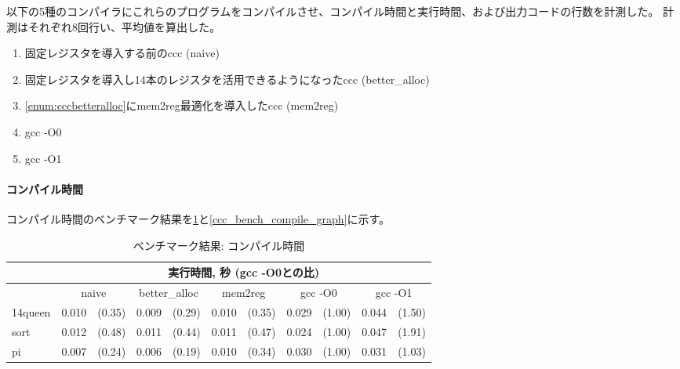 \documentclass[uplatex,a4paper]{jsarticle}
\begin{document}
以下の5種のコンパイラにこれらのプログラムをコンパイルさせ、コンパイル時間と実行時間、および出力コードの行数を計測した。
計測はそれぞれ8回行い、平均値を算出した。

\begin{enumerate}
   \item 固定レジスタを導入する前のccc (naive)
   \item \label{enum:cccbetteralloc} 固定レジスタを導入し14本のレジスタを活用できるようになったccc (better\_alloc)
   \item \cref{enum:cccbetteralloc}にmem2reg最適化を導入したccc (mem2reg)
   \item gcc -O0
   \item gcc -O1
\end{enumerate}

\clearpage
\paragraph{コンパイル時間}

コンパイル時間のベンチマーク結果を\cref{ccc_bench_compile}と\cref{ccc_bench_compile_graph}に示す。

\begin{table}[h]
  \centering
  \begin{tabular}{l|rl|rl|rl|rl|rl}
    &\multicolumn{10}{c}{実行時間, 秒 (gcc -O0との比)} \\ \hline
    &\multicolumn{2}{c|}{naive}&\multicolumn{2}{c|}{better\_alloc}&\multicolumn{2}{c|}{mem2reg}&\multicolumn{2}{c|}{gcc -O0}&\multicolumn{2}{c}{gcc -O1} \\ \hline\hline
    14queen&0.010&(0.35)&0.009&(0.29)&0.010&(0.35)&0.029&(1.00)&0.044&(1.50) \\
    sort&0.012&(0.48)&0.011&(0.44)&0.011&(0.47)&0.024&(1.00)&0.047&(1.91) \\
    pi&0.007&(0.24)&0.006&(0.19)&0.010&(0.34)&0.030&(1.00)&0.031&(1.03) \\
  \end{tabular}
  \caption{ベンチマーク結果: コンパイル時間}
  \label{ccc_bench_compile}
\end{table}
\end{document}
